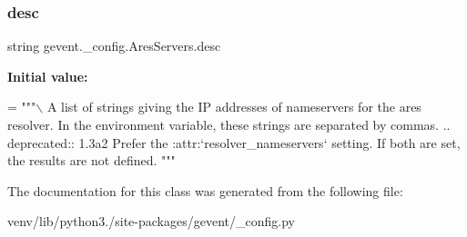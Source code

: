 \subsubsection{\texorpdfstring{desc}{desc}}
{\footnotesize\ttfamily string gevent.\+\_\+config.\+Ares\+Servers.\+desc\hspace{0.3cm}{\ttfamily [static]}}

{\bfseries Initial value\+:}
\begin{DoxyCode}
=  \textcolor{stringliteral}{"""\(\backslash\)}
\textcolor{stringliteral}{A list of strings giving the IP addresses of nameservers for the ares resolver.}
\textcolor{stringliteral}{}
\textcolor{stringliteral}{In the environment variable, these strings are separated by commas.}
\textcolor{stringliteral}{}
\textcolor{stringliteral}{.. deprecated:: 1.3a2}
\textcolor{stringliteral}{   Prefer the :attr:`resolver\_nameservers` setting. If both are set,}
\textcolor{stringliteral}{   the results are not defined.}
\textcolor{stringliteral}{"""}
\end{DoxyCode}


The documentation for this class was generated from the following file\+:\begin{DoxyCompactItemize}
\item 
venv/lib/python3./site-\/packages/gevent/\+\_\+config.\+py\end{DoxyCompactItemize}
